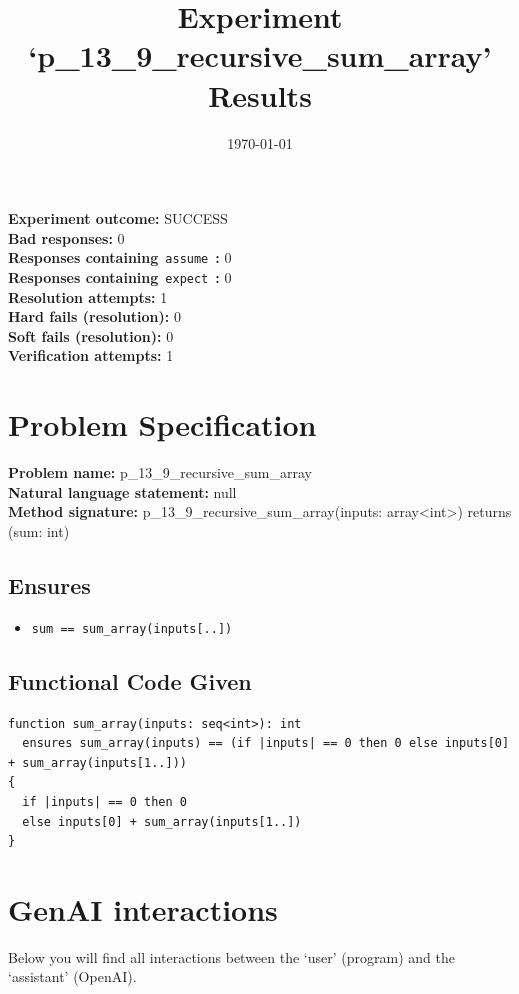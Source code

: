 \documentclass{article}
\begin{document}
\title{Experiment `p\_13\_9\_recursive\_sum\_array' Results}
\author{\today}
\date{}
\maketitle
\textbf{Experiment outcome: }SUCCESS
\\\textbf{Bad responses: }0
\\\textbf{Responses containing}~\texttt{assume}~\textbf{: }0
\\\textbf{Responses containing}~\texttt{expect}~\textbf{: }0
\\\textbf{Resolution attempts: }1
\\\textbf{Hard fails (resolution): }0
\\\textbf{Soft fails (resolution): }0
\\\textbf{Verification attempts: }1
\section*{Problem Specification}
\textbf{Problem name: }p\_13\_9\_recursive\_sum\_array
\\\textbf{Natural language statement: }null
\\\textbf{Method signature: }p\_13\_9\_recursive\_sum\_array(inputs: array<int>) returns (sum: int)
\subsection*{Ensures}
\begin{itemize}
\item \texttt{sum == sum\_array(inputs[..])}
\end{itemize}
\subsection*{Functional Code Given}
\begin{lstlisting}
function sum_array(inputs: seq<int>): int
  ensures sum_array(inputs) == (if |inputs| == 0 then 0 else inputs[0] + sum_array(inputs[1..]))
{
  if |inputs| == 0 then 0
  else inputs[0] + sum_array(inputs[1..])
}
\end{lstlisting}
\clearpage
\section*{GenAI interactions}
Below you will find all interactions between the `user' (program) and the `assistant' (OpenAI).
\end{document}
